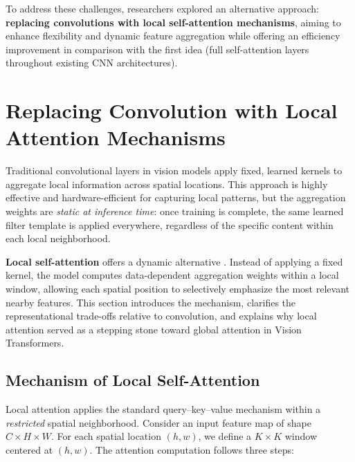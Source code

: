 \noindent To address these challenges, researchers explored an alternative approach: \textbf{replacing convolutions with local self-attention mechanisms}, aiming to enhance flexibility and dynamic feature aggregation while offering an efficiency improvement in comparison with the first idea (full self-attention layers throughout existing CNN architectures). 

\newpage

\section{Replacing Convolution with Local Attention Mechanisms}
\label{sec:chapter18_local_attention}

\noindent
Traditional convolutional layers in vision models apply fixed, learned kernels to aggregate local information across spatial locations.
This approach is highly effective and hardware-efficient for capturing local patterns, but the aggregation weights are \emph{static at inference time}:
once training is complete, the same learned filter template is applied everywhere, regardless of the specific content within each local neighborhood.

\noindent
\textbf{Local self-attention} offers a dynamic alternative \cite{ramachandran2019_standalone}.
Instead of applying a fixed kernel, the model computes data-dependent aggregation weights within a local window, allowing each spatial position to selectively emphasize the most relevant nearby features.
This section introduces the mechanism, clarifies the representational trade-offs relative to convolution, and explains why local attention served as a stepping stone toward global attention in Vision Transformers.

\subsection{Mechanism of Local Self-Attention}
\label{subsec:chapter18_local_attention_mechanism}

\noindent
Local attention applies the standard query--key--value mechanism within a \emph{restricted} spatial neighborhood.
Consider an input feature map of shape \(C \times H \times W\).
For each spatial location \((h,w)\), we define a \(K \times K\) window centered at \((h,w)\).
The attention computation follows three steps:

